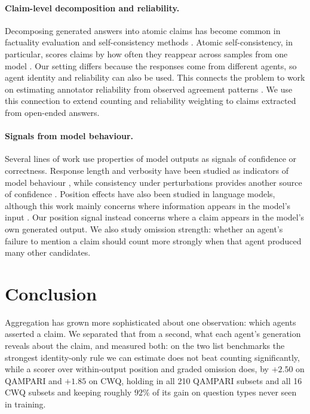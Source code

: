 \documentclass{article}
\begin{document}
\paragraph{Claim-level decomposition and reliability.}
Decomposing generated answers into atomic claims has become common in factuality evaluation and self-consistency methods \cite{thirukovalluru2024atomic,zhang2024atomic,ning2025mad,wan2025fastfact,liu2025verifact,goel2025zero,panou2025harnessing}. Atomic self-consistency, in particular, scores claims by how often they reappear across samples from one model \cite{thirukovalluru2024atomic}. Our setting differs because the responses come from different agents, so agent identity and reliability can also be used. This connects the problem to work on estimating annotator reliability from observed agreement patterns \cite{dawid1979maximum,sinha2018fast,majdi2023crowd,kuzin2025improving}. We use this connection to extend counting and reliability weighting to claims extracted from open-ended answers.

\paragraph{Signals from model behaviour.}
Several lines of work use properties of model outputs as signals of confidence or correctness. Response length and verbosity have been studied as indicators of model behaviour \cite{janiak2025illusion,zhang2024verbosity}, while consistency under perturbations provides another source of confidence \cite{wu2026this,ahn2025prompt}. Position effects have also been studied in language models, although this work mainly concerns where information appears in the model's input \cite{guo2024serial,zhang2026position,salvatore2025lost,qiao2026llm,yan2026evirank}. Our position signal instead concerns where a claim appears in the model's own generated output. We also study omission strength: whether an agent's failure to mention a claim should count more strongly when that agent produced many other candidates.



\section{Conclusion}
\label{sec:conclusion}

Aggregation has grown more sophisticated about one observation: which agents asserted a claim. We separated that from a second, what each agent's generation reveals about the claim, and measured both: on the two list benchmarks the strongest identity-only rule we can estimate does not beat counting significantly, while a scorer over within-output position and graded omission does, by $+2.50$ on QAMPARI and $+1.85$ on CWQ, holding in all 210 QAMPARI subsets and all 16 CWQ subsets and keeping roughly $92\%$ of its gain on question types never seen in training.
\end{document}
